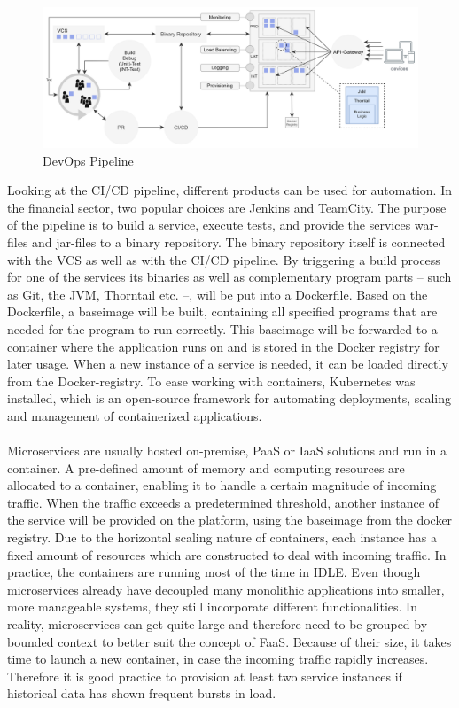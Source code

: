 \documentclass[a4paper,twoside,11pt, pagesize]{scrartcl}
\begin{document}
\begin{spacing}{1.2}
\begin{figure}[H]
\label{fig:devopsone}
\centering
\includegraphics[width=1\textwidth]{devopsone}
\caption{DevOps Pipeline}
\end{figure}
Looking at the CI/CD pipeline, different products can be used for automation. In the financial sector, two popular choices are Jenkins and TeamCity. The purpose of the pipeline is to build a service, execute tests, and provide the services war-files and jar-files to a binary repository. The binary repository itself is connected with the VCS as well as with the CI/CD pipeline. By triggering a build process for one of the services its binaries as well as complementary program parts -- such as Git, the JVM, Thorntail etc. --, will be put into a Dockerfile. Based on the Dockerfile, a baseimage will be built, containing all specified programs that are needed for the program to run correctly. This baseimage will be forwarded to a container where the application runs on and is stored in the Docker registry for later usage. When a new instance of a service is needed, it can be loaded directly from the Docker-registry. To ease working with containers, Kubernetes was installed, which is an open-source framework for automating deployments, scaling and management of containerized applications.\\\\ Microservices are usually hosted on-premise, PaaS or IaaS solutions and run in a container. A pre-defined amount of memory and computing resources are allocated to a container, enabling it to handle a certain magnitude of incoming traffic. When the traffic exceeds a predetermined threshold, another instance of the service will be provided on the platform, using the baseimage from the docker registry. Due to the horizontal scaling nature of containers, each instance has a fixed amount of resources which are constructed to deal with incoming traffic.  In practice, the containers are running most of the time in IDLE. Even though microservices already have decoupled many monolithic applications into smaller, more manageable systems, they still incorporate different functionalities. In reality, microservices can get quite large and therefore need to be grouped by bounded context to better suit the concept of FaaS. Because of their size, it takes time to launch a new container, in case the incoming traffic rapidly increases. Therefore it is good practice to provision at least two service instances if historical data has shown frequent bursts in load. 

\end{spacing}
\end{document}
